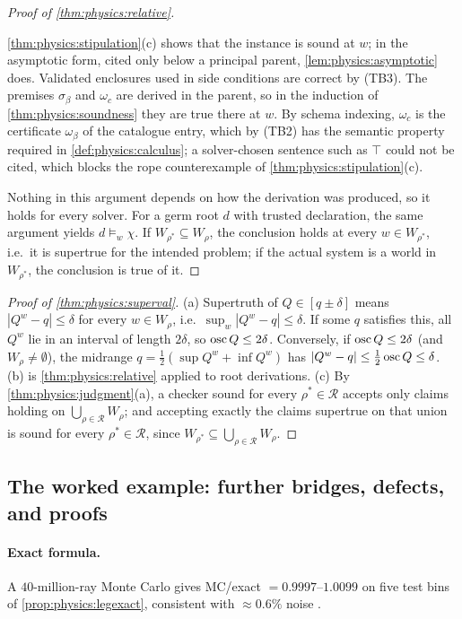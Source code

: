 \begin{proof}[Proof of \cref{thm:physics:relative}]
\begin{itemize}
  \cref{thm:physics:stipulation}(c) shows that the instance is sound at $w$; in the
  asymptotic form, cited only below a principal parent, \cref{lem:physics:asymptotic} does.
  Validated enclosures used in side conditions are correct by (TB3). The premises
  $\sigma_\beta$ and $\omega_c$ are derived in the parent, so in the induction of
  \cref{thm:physics:soundness} they are true there at $w$. By schema indexing, $\omega_c$ is
  the certificate $\omega_\beta$ of the catalogue entry, which by (TB2) has the semantic
  property required in \cref{def:physics:calculus}; a solver-chosen sentence such as $\top$
  could not be cited, which blocks the rope counterexample of
  \cref{thm:physics:stipulation}(c).
\end{itemize}
Nothing in this argument depends on how the derivation was produced, so it holds for every
solver. For a germ root $d$ with trusted declaration, the same argument yields
$d\models_w\chi$. If $W_{\rho^*}\subseteq W_\rho$, the conclusion holds at every
$w\in W_{\rho^*}$, i.e.\ it is supertrue for the intended problem; if the actual system is a
world in $W_{\rho^*}$, the conclusion is true of it.
\end{proof}

\begin{proof}[Proof of \cref{thm:physics:superval}]
(a) Supertruth of $Q\in[q\pm\delta]$ means $|Q^w-q|\le\delta$ for every $w\in W_\rho$, i.e.\
$\sup_w|Q^w-q|\le\delta$. If some $q$ satisfies this, all $Q^w$ lie in an interval of length
$2\delta$, so $\operatorname{osc} Q\le2\delta$. Conversely, if $\operatorname{osc} Q\le2\delta$ (and $W_\rho\neq\emptyset$),
the midrange $q=\frac12(\sup Q^w+\inf Q^w)$ has $|Q^w-q|\le\frac12\operatorname{osc} Q\le\delta$. (b) is
\cref{thm:physics:relative} applied to root derivations. (c) By
\cref{thm:physics:judgment}(a), a checker sound for every $\rho^*\in\mathcal R$ accepts only
claims holding on $\bigcup_{\rho\in\mathcal R}W_\rho$; and accepting exactly the claims
supertrue on that union is sound for every $\rho^*\in\mathcal R$, since
$W_{\rho^*}\subseteq\bigcup_{\rho\in\mathcal R}W_\rho$.
\end{proof}

\subsection{The worked example: further bridges, defects, and proofs}\label{app:physics:example}

\paragraph{Exact formula.} A $40$-million-ray Monte Carlo gives MC/exact $=0.9997$--$1.0099$
on five test bins of \cref{prop:physics:legexact}, consistent with ${\approx}0.6\%$ noise
\status{computed}.

